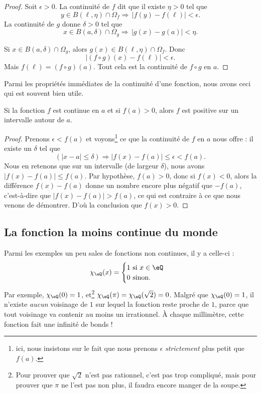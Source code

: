 \begin{proof}
	Soit \( \epsilon>0\). La continuité de \( f\) dit que il existe \( \eta>0\) tel que
	\begin{equation}
		y\in B(\ell,\eta)\cap\Omega_f\Rightarrow\,| f(y)-f(\ell) |<\epsilon.
	\end{equation}
	La continuité de \( g\) donne \( \delta>0\) tel que
	\begin{equation}
		x\in B(a,\delta)\cap\Omega_g\Rightarrow\,| g(x)-g(a) |<\eta.
	\end{equation}

	Si \( x\in B(a,\delta)\cap\Omega_g\), alors \( g(x)\in B(\ell,\eta)\cap\Omega_f\). Donc
	\begin{equation}
		| (f\circ g)(x)-f(\ell) |<\epsilon.
	\end{equation}
	Mais \( f(\ell)=(f\circ g)(a)\). Tout cela est la continuité de \( f\circ g\) en \( a\).
\end{proof}


Parmi les propriétés immédiates de la continuité d'une fonction, nous avons ceci qui est souvent bien utile.

\begin{corollary}   \label{CorNNPYooMbaYZg}
	Si la fonction $f$ est continue en $a$ et si $f(a)>0$, alors $f$ est positive sur un intervalle autour de $a$.
\end{corollary}

\begin{proof}
	Prenons $\epsilon<f(a)$ et voyons\footnote{ici, nous insistons sur le fait que nous prenons $\epsilon$ \emph{strictement} plus petit que $f(a)$.} ce que la continuité de $f$ en $a$ nous offre : il existe un $\delta$ tel que
	\[
		(| x-a |\leq \delta)\Rightarrow | f(x)-f(a) |\leq\epsilon < f(a).
	\]
	Nous en retenons que sur un intervalle (de largeur $\delta$), nous avons $| f(x)-f(a) |\leq f(a)$. Par hypothèse, $f(a)>0$, donc si $f(x)<0$, alors la différence $f(x)-f(a)$ donne un nombre encore plus négatif que $-f(a)$, c'est-à-dire que $| f(x)-f(a) |>f(a)$, ce qui est contraire à ce que nous venons de démontrer. D'où la conclusion que $f(x)>0$.
\end{proof}

\subsection{La fonction la moins continue du monde}

Parmi les exemples un peu sales de fonctions non continues, il y a celle-ci :
\[
	\chi_{\eQ}(x)=
	\begin{cases}
		1 \text{ si }x\in\eQ \\
		0 \text{ sinon.}
	\end{cases}
\]
Par exemple, $\chi_{\eQ}(0)=1$, et\footnote{Pour prouver que $\sqrt{2}$ n'est pas rationnel, c'est pas trop compliqué, mais pour prouver que $\pi$ ne l'est pas non plus, il faudra encore manger de la soupe.} $\chi_{\eQ}(\pi)=\chi_{\eQ}(\sqrt{2})=0$. Malgré que $\chi_{\eQ}(0)=1$, il n'existe \emph{aucun} voisinage de $1$ sur lequel la fonction reste proche de $1$, parce que tout voisinage va contenir au moins un irrationnel. À chaque millimètre, cette fonction fait une infinité de bonds !

